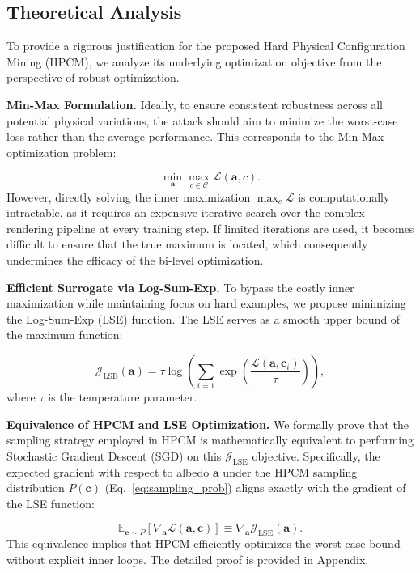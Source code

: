 \documentclass[10pt,journal,compsoc]{IEEEtran}
\begin{document}
\subsection{Theoretical Analysis}
\label{sec:4.5}
To provide a rigorous justification for the proposed Hard Physical Configuration Mining (HPCM), we analyze its underlying optimization objective from the perspective of robust optimization.

\textbf{Min-Max Formulation. }
Ideally, to ensure consistent robustness across all potential physical variations, the attack should aim to minimize the worst-case loss rather than the average performance.
This corresponds to the Min-Max optimization problem:

\begin{equation}
\min_{\mathbf{a}} \max_{c \in \mathcal{C}} \mathcal{L}(\mathbf{a}, c).
\end{equation}
However, directly solving the inner maximization $\max_{c} \mathcal{L}$ is computationally intractable, as it requires an expensive iterative search over the complex rendering pipeline at every training step. 
If limited iterations are used, it becomes difficult to ensure that the true maximum is located, which consequently undermines the efficacy of the bi-level optimization.

\textbf{Efficient Surrogate via Log-Sum-Exp. }To bypass the costly inner maximization while maintaining focus on hard examples, we propose minimizing the Log-Sum-Exp (LSE) function. 
The LSE serves as a smooth upper bound of the maximum function:

\begin{equation}
   \mathcal{J}_{\text{LSE}}(\mathbf{a}) = \tau \log \left( \sum_{i=1} \exp \left( \frac{\mathcal{L}(\mathbf{a}, \bm{c}_i)}{\tau} \right) \right), 
\end{equation}
where $\tau$ is the temperature parameter.

\textbf{Equivalence of HPCM and LSE Optimization.} We formally prove that the sampling strategy employed in HPCM is mathematically equivalent to performing Stochastic Gradient Descent (SGD) on this $\mathcal{J}_{\text{LSE}}$ objective. 
Specifically, the expected gradient with respect to albedo $\mathbf{a}$ under the HPCM sampling distribution $P(\bm{c})$ (Eq.~\ref{eq:sampling_prob}) aligns exactly with the gradient of the LSE function:

\begin{equation}
  \mathbb{E}_{\bm{c} \sim P}[\nabla_{\mathbf{a}} \mathcal{L}(\mathbf{a}, \bm{c})] \equiv \nabla_{\mathbf{a}} \mathcal{J}_{\text{LSE}}(\mathbf{a}).  
\end{equation}
This equivalence implies that HPCM efficiently optimizes the worst-case bound without explicit inner loops. 
The detailed proof is provided in Appendix.
\end{document}

